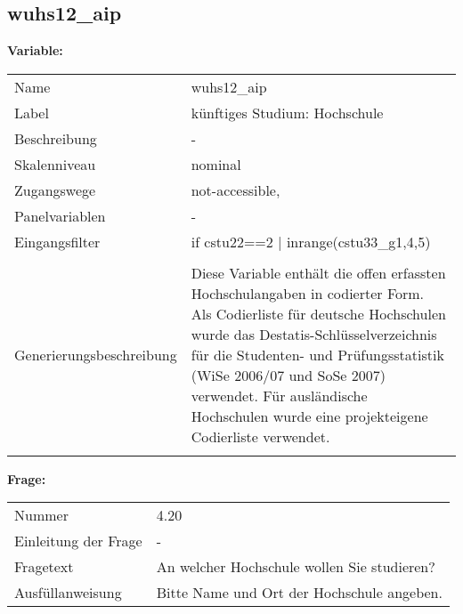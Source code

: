 	
	
	\subsection{wuhs12\_aip}
	\label{subSection:wuhs12_aip}

	\noindent\textbf{Variable:}\\
		\begin{tabular}{lL{11.3cm}}
			\label{tableVariable:wuhs12_aip}
			Name & wuhs12\_aip \\
			Label & künftiges Studium: Hochschule \\
			Beschreibung & - \\
			Skalenniveau & nominal \\
			Zugangswege &
				not-accessible,
 \\
			Panelvariablen & -
			 \\
			Eingangsfilter & if cstu22==2 | inrange(cstu33\_g1,4,5) \\
 \\
					Generierungsbeschreibung & Diese Variable enthält die offen erfassten Hochschulangaben in codierter Form. Als Codierliste für deutsche Hochschulen wurde das Destatis-Schlüsselverzeichnis für die Studenten- und Prüfungsstatistik (WiSe 2006/07 und SoSe 2007) verwendet. Für ausländische Hochschulen wurde eine projekteigene Codierliste verwendet.
				 \\	
			 \\
		\end{tabular}

		\vspace*{1 cm}
		\noindent\textbf{Frage:}\\
		\begin{tabular}{lL{11.3cm}}
			\label{tableQuestion:wuhs12_aip}
			Nummer & 4.20 \\
			Einleitung der Frage & - \\
			Fragetext & An welcher Hochschule wollen Sie studieren? \\
			Ausfüllanweisung & Bitte Name und Ort der Hochschule angeben. \\
		\end{tabular}





	
	\newpage
